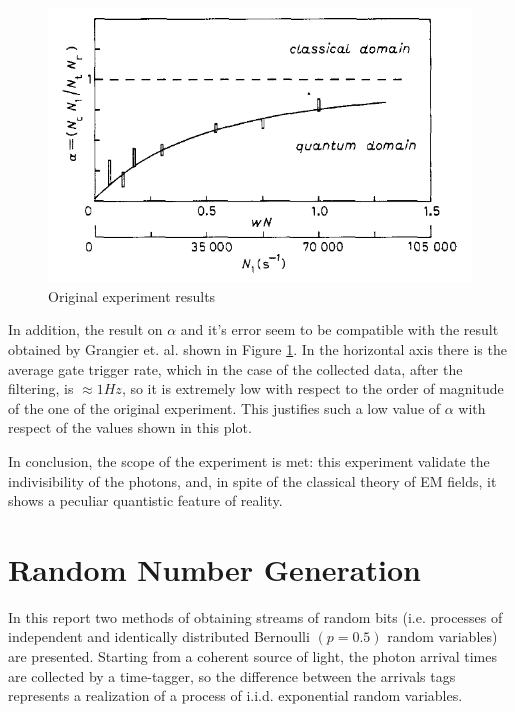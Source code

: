 \documentclass[10pt, final]{article}
\begin{document}
\begin{multicols}{2}
\begin{mdframed}
    \begin{figure}[H]
        \centering
        \includegraphics[width = \textwidth]{../images/alpha.png}
        \caption{Original experiment results}
        \label{alpha}
    \end{figure}
\end{mdframed}
In addition, the result on $\alpha$ and it's error seem to be compatible with the result obtained by Grangier et. al. shown in Figure \ref{alpha}. In the horizontal axis there is the average gate trigger rate, which in the case of the collected data, after the filtering,  is $\approx 1 Hz$, so it is extremely low with respect to the order of magnitude of the one of the original experiment. This justifies such a low value of $\alpha$ with respect of the values shown in this plot.

In conclusion, the scope of the experiment is met: this experiment validate the indivisibility of the photons, and, in spite of the classical theory of EM fields, it shows a peculiar quantistic feature of reality. 

\clearpage
\section{Random Number Generation}
In this report two methods of obtaining streams of random bits (i.e. 
 processes of independent and identically distributed Bernoulli $(p = 0.5)$ random variables) are presented.
 Starting from a coherent source of light, the photon arrival times are collected by a time-tagger, so the difference between the arrivals tags represents a realization of a process of i.i.d. exponential random variables. 


\end{multicols}
\end{document}
